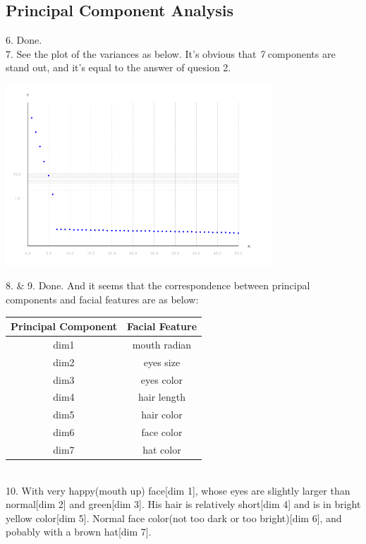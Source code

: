 \documentclass[11pt]{article} %
\begin{document}
\subsection{Principal Component Analysis}
6. Done.\\
7. See the plot of the variances as below. It's obvious that \emph{7} components are stand out, and it's equal to the answer of quesion 2.\\
\centerline{
\includegraphics[width=10cm]{pic/p3}}
8. \& 9. Done. And it seems that the correspondence between principal components and facial features are as below:
\begin{table}[!hbp]
\centering
\begin{tabular}{|c|c|}
\hline
Principal Component & Facial Feature \\
\hline
dim1 & mouth radian\\
\hline
dim2 & eyes size \\
\hline
dim3 & eyes color \\
\hline
dim4 & hair length \\
\hline
dim5 & hair color \\
\hline
dim6 & face color \\
\hline
dim7 & hat color \\
\hline
\end{tabular}
\end{table}\\
10. With very happy(mouth up) face[dim 1], whose eyes are slightly larger than normal[dim 2] and green[dim 3]. His hair is relatively short[dim 4] and is in bright yellow color[dim 5]. Normal face color(not too dark or too bright)[dim 6], and pobably with a brown hat[dim 7].\\
\end{document}
